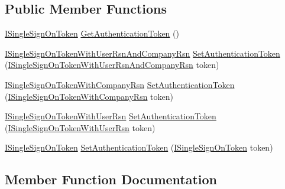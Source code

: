 \subsection*{Public Member Functions}
\begin{DoxyCompactItemize}
\item 
\hyperlink{interfaceCqrs_1_1Authentication_1_1ISingleSignOnToken}{I\+Single\+Sign\+On\+Token} \hyperlink{classCqrs_1_1Authentication_1_1WebSingleSignOnTokenValueHelper_a342055eafc9218e08d0e67bcccc912d5}{Get\+Authentication\+Token} ()
\item 
\hyperlink{interfaceCqrs_1_1Authentication_1_1ISingleSignOnTokenWithUserRsnAndCompanyRsn}{I\+Single\+Sign\+On\+Token\+With\+User\+Rsn\+And\+Company\+Rsn} \hyperlink{classCqrs_1_1Authentication_1_1WebSingleSignOnTokenValueHelper_af7ff2651f39af93b2b32a5a8646ce25a}{Set\+Authentication\+Token} (\hyperlink{interfaceCqrs_1_1Authentication_1_1ISingleSignOnTokenWithUserRsnAndCompanyRsn}{I\+Single\+Sign\+On\+Token\+With\+User\+Rsn\+And\+Company\+Rsn} token)
\item 
\hyperlink{interfaceCqrs_1_1Authentication_1_1ISingleSignOnTokenWithCompanyRsn}{I\+Single\+Sign\+On\+Token\+With\+Company\+Rsn} \hyperlink{classCqrs_1_1Authentication_1_1WebSingleSignOnTokenValueHelper_a90608051ba881a8b7166db2f12d54b57}{Set\+Authentication\+Token} (\hyperlink{interfaceCqrs_1_1Authentication_1_1ISingleSignOnTokenWithCompanyRsn}{I\+Single\+Sign\+On\+Token\+With\+Company\+Rsn} token)
\item 
\hyperlink{interfaceCqrs_1_1Authentication_1_1ISingleSignOnTokenWithUserRsn}{I\+Single\+Sign\+On\+Token\+With\+User\+Rsn} \hyperlink{classCqrs_1_1Authentication_1_1WebSingleSignOnTokenValueHelper_a4e87135209dbc5325decf308e85408ed}{Set\+Authentication\+Token} (\hyperlink{interfaceCqrs_1_1Authentication_1_1ISingleSignOnTokenWithUserRsn}{I\+Single\+Sign\+On\+Token\+With\+User\+Rsn} token)
\item 
\hyperlink{interfaceCqrs_1_1Authentication_1_1ISingleSignOnToken}{I\+Single\+Sign\+On\+Token} \hyperlink{classCqrs_1_1Authentication_1_1WebSingleSignOnTokenValueHelper_a610771aef2e0c8e0513e76577da2a4c8}{Set\+Authentication\+Token} (\hyperlink{interfaceCqrs_1_1Authentication_1_1ISingleSignOnToken}{I\+Single\+Sign\+On\+Token} token)
\end{DoxyCompactItemize}


\subsection{Member Function Documentation}
\mbox{\label{classCqrs_1_1Authentication_1_1WebSingleSignOnTokenValueHelper_a342055eafc9218e08d0e67bcccc912d5}} 
